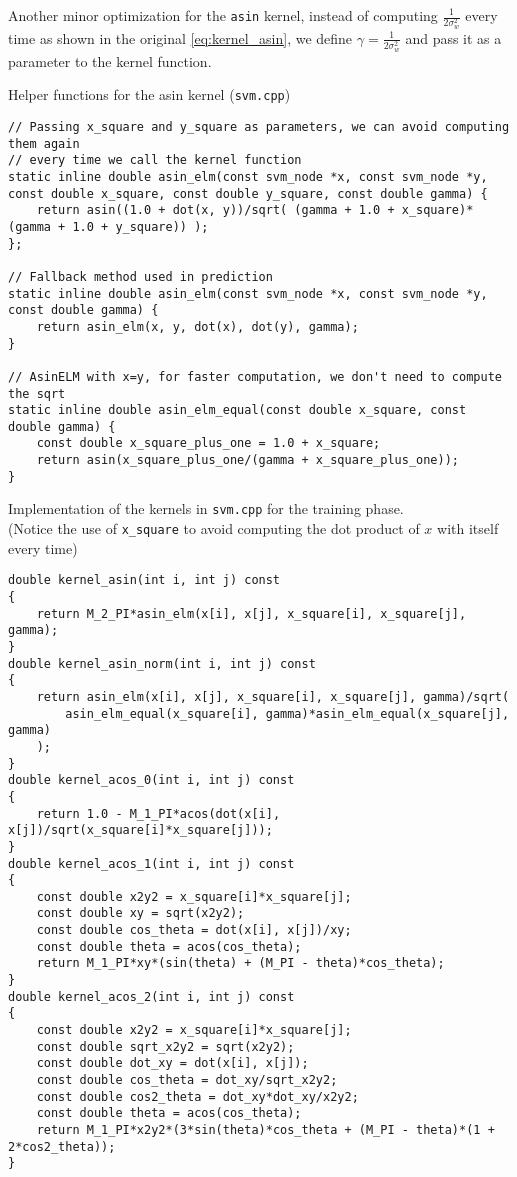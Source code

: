 Another minor optimization for the \texttt{asin} kernel, instead of computing
$\frac{1}{2\sigma_w^2}$ every time as shown in the original
\cref{eq:kernel_asin}, we define $\gamma = \frac{1}{2\sigma_w^2}$ and pass it as
a parameter to the kernel function.

\begin{listing}[H]
    \caption{Helper functions for the asin kernel (\texttt{svm.cpp})}
    \label{lst:svm_cpp_helper}
    \begin{verbatim}
// Passing x_square and y_square as parameters, we can avoid computing them again
// every time we call the kernel function
static inline double asin_elm(const svm_node *x, const svm_node *y, const double x_square, const double y_square, const double gamma) {
    return asin((1.0 + dot(x, y))/sqrt( (gamma + 1.0 + x_square)* (gamma + 1.0 + y_square)) );
};

// Fallback method used in prediction
static inline double asin_elm(const svm_node *x, const svm_node *y, const double gamma) {
    return asin_elm(x, y, dot(x), dot(y), gamma);
}

// AsinELM with x=y, for faster computation, we don't need to compute the sqrt
static inline double asin_elm_equal(const double x_square, const double gamma) {
    const double x_square_plus_one = 1.0 + x_square;
    return asin(x_square_plus_one/(gamma + x_square_plus_one));
}
\end{verbatim}
\end{listing}

\begin{listing}
    \caption{Implementation of the kernels in \texttt{svm.cpp} for the training phase. \\[0.5em]
        (Notice the use of \texttt{x\_square} to avoid computing the dot product of $x$ with itself every time)
    }
    \label{lst:kernel_function}
    \begin{verbatim}
double kernel_asin(int i, int j) const
{
    return M_2_PI*asin_elm(x[i], x[j], x_square[i], x_square[j], gamma);
}
double kernel_asin_norm(int i, int j) const
{
    return asin_elm(x[i], x[j], x_square[i], x_square[j], gamma)/sqrt(
        asin_elm_equal(x_square[i], gamma)*asin_elm_equal(x_square[j], gamma)
    );
}
double kernel_acos_0(int i, int j) const
{
    return 1.0 - M_1_PI*acos(dot(x[i], x[j])/sqrt(x_square[i]*x_square[j]));
}
double kernel_acos_1(int i, int j) const
{
    const double x2y2 = x_square[i]*x_square[j];
    const double xy = sqrt(x2y2);
    const double cos_theta = dot(x[i], x[j])/xy;
    const double theta = acos(cos_theta);
    return M_1_PI*xy*(sin(theta) + (M_PI - theta)*cos_theta);
}
double kernel_acos_2(int i, int j) const
{
    const double x2y2 = x_square[i]*x_square[j];
    const double sqrt_x2y2 = sqrt(x2y2);
    const double dot_xy = dot(x[i], x[j]);
    const double cos_theta = dot_xy/sqrt_x2y2;
    const double cos2_theta = dot_xy*dot_xy/x2y2;
    const double theta = acos(cos_theta);
    return M_1_PI*x2y2*(3*sin(theta)*cos_theta + (M_PI - theta)*(1 + 2*cos2_theta));
}
\end{verbatim}
\end{listing}


